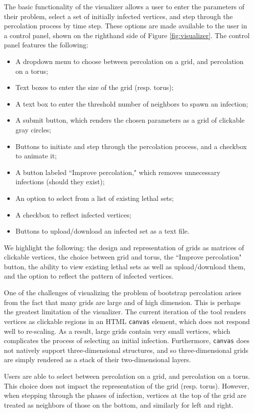 The basic functionality of the visualizer allows a user to enter the parameters of their problem, select a set of initially infected vertices, and step through the percolation process by time step. These options are made available to the user in a control panel, shown on the righthand side of Figure \ref{fig:visualizer}. The control panel features the following:
\begin{itemize}
\item A dropdown menu to choose between percolation on a grid, and percolation on a torus;
\item Text boxes to enter the size of the grid (resp. torus);
\item A text box to enter the threshold number of neighbors to spawn an infection;
\item A submit button, which renders the chosen parameters as a grid of clickable gray circles;
\item Buttons to initiate and step through the percolation process, and a checkbox to animate it;
\item A button labeled ``Improve percolation," which removes unnecessary infections (should they exist);
\item An option to select from a list of existing lethal sets;
\item A checkbox to reflect infected vertices;
\item Buttons to upload/download an infected set as a text file.
\end{itemize}
We highlight the following: the design and representation of grids as matrices of clickable vertices, the choice between grid and torus, the ``Improve percolation" button, the ability to view existing lethal sets as well as upload/download them, and the option to reflect the pattern of infected vertices. 

One of the challenges of visualizing the problem of bootstrap percolation arises from the fact that many grids are large and of high dimension. This is perhaps the greatest limitation of the visualizer. The current iteration of the tool renders vertices as clickable regions in an HTML \texttt{canvas} element, which does not respond well to re-scaling. As a result, large grids contain very small vertices, which complicates the process of selecting an initial infection. Furthermore, \texttt{canvas} does not natively support three-dimensional structures, and so three-dimensional grids are simply rendered as a stack of their two-dimensional layers. 

Users are able to select between percolation on a grid, and percolation on a torus. This choice does not impact the representation of the grid (resp. torus). However, when stepping through the phases of infection, vertices at the top of the grid are treated as neighbors of those on the bottom, and similarly for left and right. 

